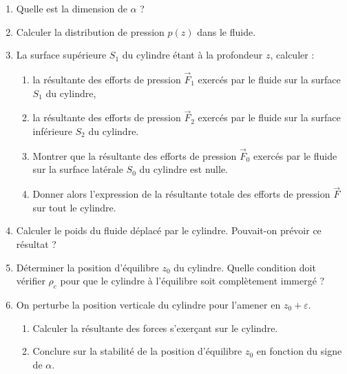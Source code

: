 {{\begin{enumerate}
\item
Quelle est la dimension de $\alpha$ ?
\item
Calculer la distribution de pression $p(z)$ dans le fluide.
\item
La surface sup\'erieure $S_1$ du cylindre \'etant \`a la profondeur $z$,
calculer :
\begin{enumerate}
\item
la r\'esultante des efforts de pression $\vec{F}_1$
exerc\'es par le fluide sur la surface $S_1$ du cylindre,
\item
la r\'esultante des efforts de pression $\vec{F}_2$
exerc\'es par le fluide sur la surface inf\'erieure $S_2$ du cylindre.
\item
Montrer que la r\'esultante des efforts de pression $\vec{F}_0$
exerc\'es par le fluide sur la surface lat\'erale $S_0$ du cylindre est nulle.
\item
Donner alors l'expression de la r\'esultante totale des efforts de pression 
$\vec{F}$ sur tout le cylindre.
\end{enumerate}
\item
Calculer le poids du fluide d\'eplac\'e par le cylindre.
Pouvait-on pr\'evoir ce r\'esultat ?
\item
D\'eterminer la position d'\'equilibre $z_0$ du cylindre.
Quelle condition doit v\'erifier $\rho_c$ pour que le cylindre \`a 
l'\'equilibre soit compl\`etement immerg\'e ?
\item
On perturbe la position verticale du cylindre pour l'amener en
$z_0 + \varepsilon$. 
\begin{enumerate}
\item
Calculer la r\'esultante des forces s'exer\c{c}ant sur le cylindre.
\item
Conclure sur la stabilit\'e de la position d'\'equilibre $z_0$ en fonction
du signe de $\alpha$.
\end{enumerate}
\end{enumerate}

}
}
